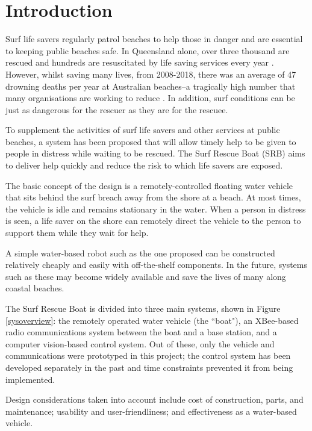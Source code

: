 \documentclass[a4paper]{IEEEtran}
\begin{document}
\setcounter{tocdepth}{2}
\tableofcontents

\section{Introduction}
Surf life savers regularly patrol beaches to help those in danger and are essential to keeping public beaches safe. In Queensland alone, over three thousand are rescued and hundreds are resuscitated by life saving services every year \cite{lifesaving}. However, whilst saving many lives, from 2008-2018, there was an average of 47 drowning deaths per year at Australian beaches--a tragically high number that many organisations are working to reduce \cite{drowning}. In addition, surf conditions can be just as dangerous for the rescuer as they are for the rescuee.

To supplement the activities of surf life savers and other services at public beaches, a system has been proposed that will allow timely help to be given to people in distress while waiting to be rescued. The Surf Rescue Boat (SRB) aims to deliver help quickly and reduce the risk to which life savers are exposed.

The basic concept of the design is a remotely-controlled floating water vehicle that sits behind the surf breach away from the shore at a beach. At most times, the vehicle is idle and remains stationary in the water. When a person in distress is seen, a life saver on the shore can remotely direct the vehicle to the person to support them while they wait for help.

A simple water-based robot such as the one proposed can be constructed relatively cheaply and easily with off-the-shelf components. In the future, systems such as these may become widely available and save the lives of many along coastal beaches.

The Surf Rescue Boat is divided into three main systems, shown in Figure \ref{sysoverview}: the remotely operated water vehicle (the ``boat"), an XBee-based radio communications system between the boat and a base station, and a computer vision-based control system. Out of these, only the vehicle and communications were prototyped in this project; the control system has been developed separately in the past and time constraints prevented it from being implemented.

Design considerations taken into account include cost of construction, parts, and maintenance; usability and user-friendliness; and effectiveness as a water-based vehicle.
\end{document}
